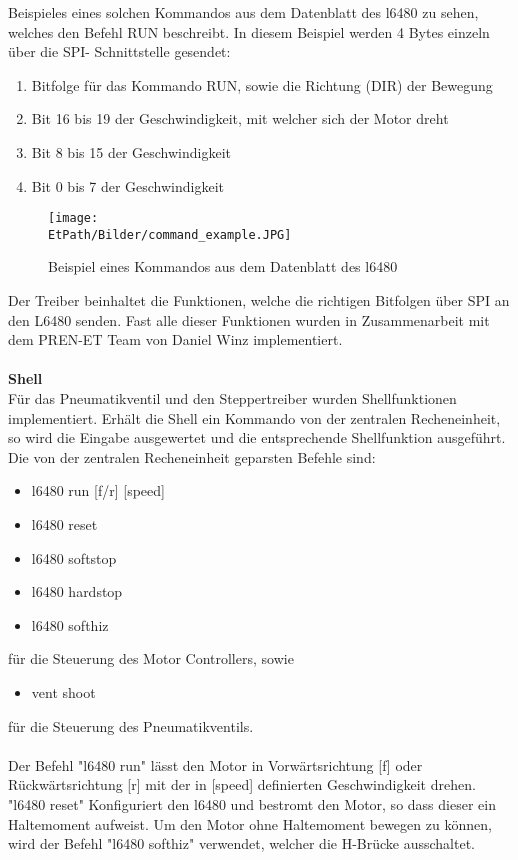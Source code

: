     Beispieles eines solchen Kommandos aus dem Datenblatt des l6480 zu sehen, 
    welches den Befehl RUN beschreibt. In diesem Beispiel werden 4 Bytes 
    einzeln über die SPI- Schnittstelle gesendet: 
    \begin{enumerate}
        \item Bitfolge für das Kommando RUN, sowie die Richtung (DIR) der Bewegung
        \item Bit 16 bis 19 der Geschwindigkeit, mit welcher sich der Motor dreht
        \item Bit 8 bis 15 der Geschwindigkeit
        \item Bit 0 bis 7 der Geschwindigkeit
    \end{enumerate}
    \begin{figure}[h!]
        \centering
        \texttt{[image: \\EtPath/Bilder/command\_example.JPG]}
        \caption{Beispiel eines Kommandos aus dem Datenblatt des l6480}
        \label{fig:command}
    \end{figure}
    Der Treiber beinhaltet die Funktionen, welche die richtigen Bitfolgen über 
    SPI an den L6480 senden. Fast alle dieser Funktionen wurden in 
    Zusammenarbeit mit dem PREN-ET Team von Daniel Winz implementiert.  
    \\\\
    \textbf{Shell}\\
    Für das Pneumatikventil und den Steppertreiber wurden Shellfunktionen 
    implementiert. Erhält die Shell ein Kommando von der zentralen 
    Recheneinheit, so wird die Eingabe ausgewertet und die entsprechende 
    Shellfunktion ausgeführt. Die von der zentralen Recheneinheit geparsten 
    Befehle sind:  
    \begin{itemize}
        \item l6480 run [f/r] [speed]
        \item l6480 reset
        \item l6480 softstop
        \item l6480 hardstop
        \item l6480 softhiz
    \end{itemize}
    für die Steuerung des Motor Controllers, sowie
    \begin{itemize}
        \item vent shoot
    \end{itemize}
    für die Steuerung des Pneumatikventils. 
    \\\\
    Der Befehl "l6480 run" lässt den Motor in Vorwärtsrichtung [f] oder 
    Rückwärtsrichtung [r] mit der in [speed] definierten Geschwindigkeit 
    drehen. "l6480 reset" Konfiguriert den l6480 und bestromt den Motor, so 
    dass dieser ein Haltemoment aufweist. Um den Motor ohne Haltemoment 
    bewegen zu können, wird der Befehl "l6480 softhiz" verwendet, welcher die 
    H-Brücke ausschaltet. 
    
